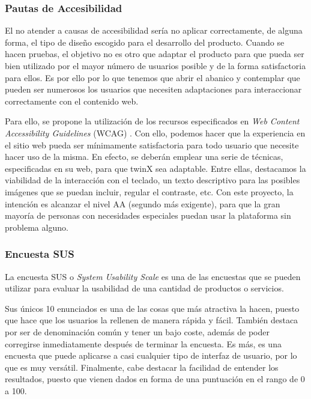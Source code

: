 \subsubsection{Pautas de Accesibilidad}

El no atender a causas de accesibilidad sería no aplicar correctamente, de alguna forma, el tipo de diseño escogido para el desarrollo del producto. Cuando se hacen pruebas, el objetivo no es otro que adaptar el producto para que pueda ser bien utilizado por el mayor número de usuarios posible y de la forma satisfactoria para ellos. Es por ello por lo que tenemos que abrir el abanico y contemplar que pueden ser numerosos los usuarios que necesiten adaptaciones para interaccionar correctamente con el contenido web.

Para ello, se propone la utilización de los recursos especificados en \textit{Web Content Accessibility Guidelines} (WCAG) \citep{wcag}. Con ello, podemos hacer que la experiencia en el sitio web pueda ser mínimamente satisfactoria para todo usuario que necesite hacer uso de la misma. En efecto, se deberán emplear una serie de técnicas, especificadas en su web, para que twinX sea adaptable. Entre ellas, destacamos la viabilidad de la interacción con el teclado, un texto descriptivo para las posibles imágenes que se puedan incluir, regular el contraste, etc. Con este proyecto, la intención es alcanzar el nivel AA (segundo más exigente), para que la gran mayoría de personas con necesidades especiales puedan usar la plataforma sin problema alguno.

\subsubsection{Encuesta SUS}

La encuesta SUS o \textit{System Usability Scale} es una de las encuestas que se pueden utilizar para evaluar la usabilidad de una cantidad de productos o servicios.

Sus únicos 10 enunciados es una de las cosas que más atractiva la hacen, puesto que hace que los usuarios la rellenen de manera rápida y fácil. También destaca por ser de denominación común y tener un bajo coste, además de poder corregirse inmediatamente después de terminar la encuesta. Es más, es una encuesta que puede aplicarse a casi cualquier tipo de interfaz de usuario, por lo que es muy versátil. Finalmente, cabe destacar la facilidad de entender los resultados, puesto que vienen dados en forma de una puntuación en el rango de 0 a 100.

